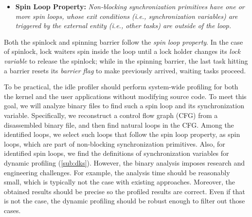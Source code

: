 \vspace{1px}
\begin{itemize}
\item[]
\textbf{Spin Loop Property:}
{\em
  Non-blocking synchronization primitives have one or more spin loops,
  whose exit conditions (i.e., synchronization variables)
  are triggered by the external entity (i.e., other tasks) are outside of
  the loop.}
\end{itemize}
\vspace{1px}

Both the spinlock and spinning barrier follow the \textit{spin loop property}.
In the case of spinlock, lock waiters spin inside the loop until a lock holder
changes its {\em lock variable} to release the spinlock;
while in the spinning barrier, the last task hitting a barrier resets its {\em
barrier flag} to make previously arrived, waiting tasks proceed.

To be practical, the idle profiler should
perform system-wide profiling for both the kernel and the user
applications without modifying source code.
To meet this goal, we will analyze binary files to find such a spin loop and
its synchronization variable.
Specifically, we reconstruct a control
flow graph (CFG) from a disassembled binary file, and then find natural loops
in the CFG.
Among the identified loops, we select such loops that follow the spin loop
property, as spin loops, which are part of non-blocking
synchronization primitives. Also, for identified spin loops, we find
the definitions of synchronization variables for dynamic profiling
(\autoref{sub:dks}).
%
However, the binary analysis imposes research and engineering
challenges. For example, the analysis time should be reasonably small,
which is typically not the case with existing
approaches. Moreover, the obtained results should be precise so
the profiled results are correct. Even if that is not the case, the
dynamic profiling should be robust enough to filter out those cases.
